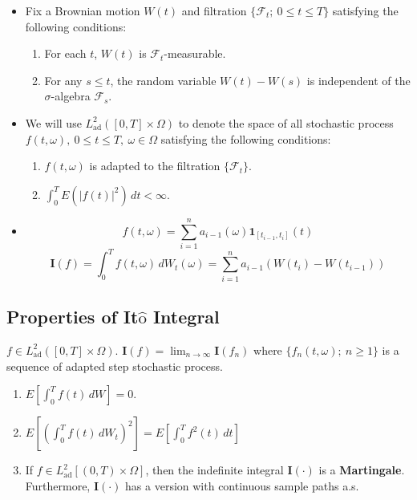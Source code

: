 \documentclass[twoside,final]{hcmut-report}
\begin{document}
 \begin{itemize}
       \item Fix a Brownian motion $W(t)$ and filtration $\{ \mathcal{F}_t; \ 0 \leq t \leq T \}$ satisfying the following conditions:
       \begin{enumerate}
           \item For each $t$, $W(t)$ is $\mathcal{F}_t$-measurable.
           \item For any $s \leq t$, the random variable $W(t) - W(s)$ is independent of the $\sigma$-algebra $\mathcal{F}_s$.
       \end{enumerate}
       \item We will use $L_\text{ad}^2([0,T] \times \Omega)$ to denote the space of all stochastic process $f(t,\omega), \ 0 \leq t \leq T, \ \omega \in \Omega$ satisfying the following conditions:
       \begin{enumerate}
           \item $f(t,\omega)$ is adapted to the filtration $\{\mathcal{F}_t\}$.
           \item $\int_0^T{E({\left | f(t) \right |}^2)}\,dt < \infty$.
       \end{enumerate}
        \item \[f(t,\omega) = \sum_{i=1}^{n}{a_{i-1}(\omega)\mathbf{1}_{[t_{i-1},t_i]}(t)}\]
        \[\mathbf{I}(f) = \int_0^T f(t,\omega)\,dW_t(\omega) = \sum_{i=1}^n{a_{i-1}(W(t_i) - W(t_{i-1}))}\]
           \end{itemize}

\subsection{\texorpdfstring{Properties of It$\hat{\text{o}}$ Integral}{Properties of Ito Integral}}
  $f \in L_\text{ad}^2([0,T] \times \Omega)$. $\mathbf{I}(f) = \lim_{n \rightarrow \infty}\mathbf{I}(f_n)$ where $\{f_n(t,\omega); \ n \geq 1\}$ is a sequence of adapted step stochastic process.
        \begin{enumerate}
            \item ${E}[\int_0^T f(t)\,dW] = 0$.
          \item ${E}[(\int_0^T f(t)\,dW_t)^{2}] = E[\int_0^T f^{2}(t)\,dt]$ 
          \item If $f \in L^2_\text{ad}[(0,T) \times \Omega]$, then the indefinite integral $\mathbf{I}(\cdot)$ is a \textbf{Martingale}. Furthermore, $\mathbf{I}(\cdot)$ has a version with continuous sample paths a.s.
        \end{enumerate}
\end{document}
